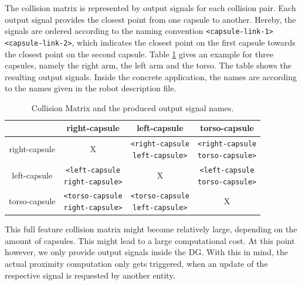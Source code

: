 The collision matrix is represented by output signals for each collision pair. Each output signal provides the closest point from one capsule to another. Hereby, the signals are ordered according to the naming convention \texttt{<capsule-link-1><capsule-link-2>}, which indicates the closest point on the first capsule towards the closest point on the second capsule. Table \ref{tab:collisionmatrix} gives an example for three capsules, namely the right arm, the left arm and the torso. The table shows the resulting output signals. Inside the concrete application, the names are according to the names given in the robot description file.

\begin{table}[width=\textwidth]
\def\arraystretch{3}
\centering
\begin{tabular}{c|c|c|c}
					& 	right-capsule & left-capsule & torso-capsule \\
					\hline
right-capsule & X	& \pbox{4cm}{\texttt{<right-capsule}\\\texttt{left-capsule>}} & \pbox{4cm}{\texttt{<right-capsule}\\\texttt{torso-capsule>}} \\
\hline
left-capsule & \pbox{4cm}{\texttt{<left-capsule}\\ \texttt{right-capsule>}} & X & \pbox{4cm}{\texttt{<left-capsule}\\\texttt{torso-capsule>}} \\
\hline
torso-capsule & \pbox{4cm}{\texttt{<torso-capsule}\\\texttt{right-capsule>}} & \pbox{4cm}{\texttt{<torso-capsule}\\\texttt{left-capsule>}} & X 
\end{tabular}
\label{tab:collisionmatrix}
\caption{Collision Matrix and the produced output signal names.}
\end{table}

This full feature collision matrix might become relatively large, depending on the amount of capsules. This might lead to a large computational cost. At this point however, we only provide output signals inside the DG. With this in mind, the actual proximity computation only gets triggered, when an update of the respective signal is requested by another entity. 
\newpage
